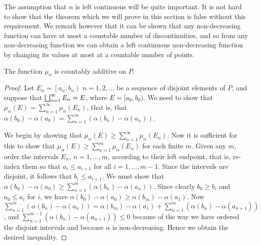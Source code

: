 The assumption that $\alpha$ is left continuous will be quite important. It is not hard to show that the theorem which we will prove in this section is false without this requirement. We remark however that it can be shown that any non-decreasing function can have at most a countable number of discontinuities, and so from any non-decreasing function we can obtain a left continuous non-decreasing function by changing its values at most at a countable number of points.

\begin{theorem}
The function $\mu_\alpha$ is countably additive on $P$.
\end{theorem}

\begin{proof}
Let $E_n=\left[a_n, b_n\right)$ $n=1, 2, \dots$ be a sequence of disjoint elements of $P$, and suppose that $\bigsqcup_{n=1}^\infty E_n=E$, where $E=[a_0, b_0)$. We need to show that $\mu_\alpha(E)=\sum_{n=1}^\infty\mu_\alpha(E_n)$, that is, that $\alpha(b_0)-\alpha(a_0)=\sum_{n=1}^\infty(\alpha(b_n)-\alpha(a_n))$.

We begin by showing that $\mu_\alpha(E) \geq \sum_{n=1}^\infty \mu_\alpha\left(E_n\right)$. Now it is sufficient for this to show that $\mu_\alpha(E) \geq \sum_{n=1}^m \mu_\alpha\left(E_n\right)$ for each finite $m$. Given any $m$, order the intervals $E_n$, $n=1, \dots, m$, according to their left endpoint, that is, re-index them so that $a_i \leq a_{i+1}$ for all $i=1, \dots, m-1$. Since the intervals are disjoint, it follows that $b_i \leq a_{i+1}$. We must show that $\alpha\left(b_0\right)-\alpha\left(a_0\right) \geq \sum_{n=1}^m\left(\alpha\left(b_n\right)-\alpha\left(a_n\right)\right)$. Since clearly $b_0 \geq b_i$ and $a_0 \leq a_i$ for $i$, we have $\alpha\left(b_0\right)-\alpha\left(a_0\right) \geq \alpha\left(b_m\right)-\alpha\left(a_1\right)$. Now $\sum_{n=1}^m\left(\alpha\left(b_n\right)-\alpha\left(a_n\right)\right)=\alpha\left(b_m\right)-\alpha\left(a_1\right)+\sum_{n=1}^m\left(\alpha\left(b_n\right)-\alpha\left(a_{n+1}\right)\right)$, and $\sum_{n=1}^{m-1}(\alpha(b_n)-\alpha(a_{n+1})) \leq 0$ because of the way we have ordered the disjoint intervals and because $\alpha$ is non-decreasing. Hence we obtain the desired inequality.


\end{proof}
